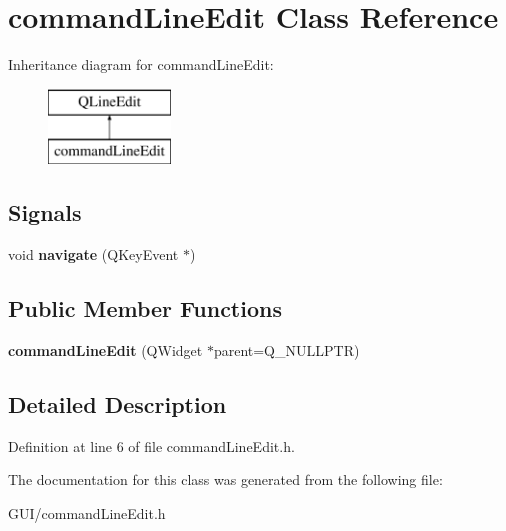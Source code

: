 \hypertarget{classcommand_line_edit}{}\section{command\+Line\+Edit Class Reference}
\label{classcommand_line_edit}
Inheritance diagram for command\+Line\+Edit\+:\begin{figure}[H]
\begin{center}
\leavevmode
\includegraphics[height=2.000000cm]{classcommand_line_edit}
\end{center}
\end{figure}
\subsection*{Signals}
\begin{DoxyCompactItemize}
\item 
\mbox{\label{classcommand_line_edit_a8e87bb58f3c41b4a3fc6e72c608e0b2f}} 
void {\bfseries navigate} (Q\+Key\+Event $\ast$)
\end{DoxyCompactItemize}
\subsection*{Public Member Functions}
\begin{DoxyCompactItemize}
\item 
\mbox{\label{classcommand_line_edit_aee0f41c33a88c1fe0f8a680e3fdad815}} 
{\bfseries command\+Line\+Edit} (Q\+Widget $\ast$parent=Q\+\_\+\+N\+U\+L\+L\+P\+TR)
\end{DoxyCompactItemize}


\subsection{Detailed Description}


Definition at line 6 of file command\+Line\+Edit.\+h.



The documentation for this class was generated from the following file\+:\begin{DoxyCompactItemize}
\item 
G\+U\+I/command\+Line\+Edit.\+h\end{DoxyCompactItemize}
